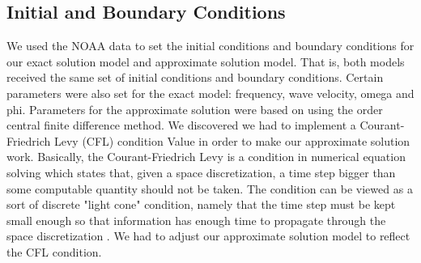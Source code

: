 \documentclass[conf]{new-aiaa}
\begin{document}
\subsection{Initial and Boundary Conditions}
We used the NOAA data to set the initial conditions and boundary conditions for our exact solution model and approximate solution model. That is, both models received the same set of initial conditions and boundary conditions. Certain parameters were also set for the exact model: frequency, wave velocity, omega and phi. Parameters for the approximate solution were based on using the  order central finite difference method. We discovered we had to implement a Courant-Friedrich Levy (CFL) condition Value in order to make our approximate solution work. Basically, the Courant-Friedrich Levy is a condition in numerical equation solving which states that, given a space discretization, a time step bigger than some computable quantity should not be taken. The condition can be viewed as a sort of discrete "light cone" condition, namely that the time step must be kept small enough so that information has enough time to propagate through the space discretization \cite{CFL}. We had to adjust our approximate solution model to reflect the CFL condition.


\end{document}
